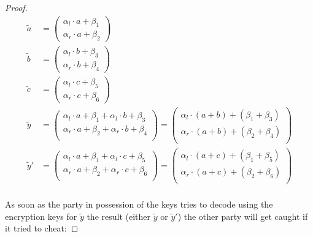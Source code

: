 \begin{proof}
  \begin{align*}
    \widetilde{a} &=
    \begin{pmatrix}
      \alpha_l \cdot a + \beta_1\\
      \alpha_r \cdot a + \beta_2
    \end{pmatrix}\\
    \widetilde{b} &=
    \begin{pmatrix}
      \alpha_l \cdot b + \beta_3\\
      \alpha_r \cdot b + \beta_4
    \end{pmatrix}\\
    \widetilde{c} &=
    \begin{pmatrix}
      \alpha_l \cdot c + \beta_5\\
      \alpha_r \cdot c + \beta_6
    \end{pmatrix}\\
    \widetilde{y} &=
    \begin{pmatrix}
      \alpha_l \cdot a + \beta_1 + \alpha_l \cdot b + \beta_3\\
      \alpha_r \cdot a + \beta_2 + \alpha_r \cdot b + \beta_4\\
    \end{pmatrix} =
    \begin{pmatrix}
      \alpha_l \cdot (a+b) + (\beta_1 + \beta_3)\\
      \alpha_r \cdot (a+b) + (\beta_2 + \beta_4)\\
    \end{pmatrix}\\
    \widetilde{y}' &=
    \begin{pmatrix}
      \alpha_l \cdot a + \beta_1 + \alpha_l \cdot c + \beta_5\\
      \alpha_r \cdot a + \beta_2 + \alpha_r \cdot c + \beta_6\\
    \end{pmatrix} =
    \begin{pmatrix}
      \alpha_l \cdot (a+c) + (\beta_1 + \beta_5)\\
      \alpha_r \cdot (a+c) + (\beta_2 + \beta_6)\\
    \end{pmatrix}\\
  \end{align*}

  \noindent{}As soon as the party in possession of the keys tries to decode
  using the encryption keys for $\widetilde{y}$ the result (either
  $\widetilde{y}$ or $\widetilde{y}'$) the other party will get caught if it
  tried to cheat:


\end{proof}
